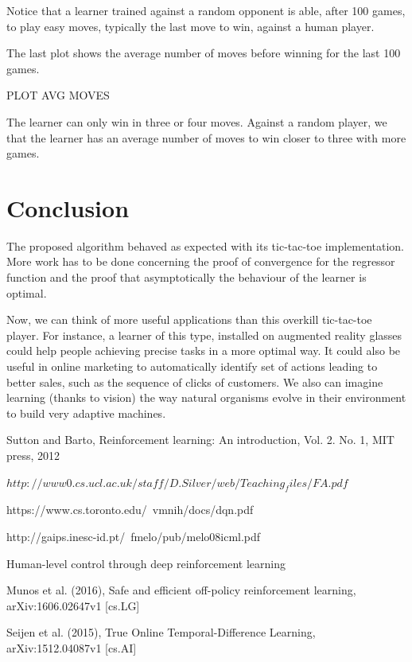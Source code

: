 \documentclass[letterpaper, 10.5 pt, conference]{ieeeconf}
\begin{document}
Notice that a learner trained against a random opponent is able, after 100 games, to play easy moves, typically the last move to win, against a human player.

The last plot shows the average number of moves before winning for the last 100 games. 

PLOT AVG MOVES

The learner can only win in three or four moves. Against a random player, we that the learner has an average number of moves to win closer to three with more games.

\section{Conclusion}

The proposed algorithm behaved as expected with its tic-tac-toe implementation. More work has to be done concerning the proof of convergence for the regressor function and the proof that asymptotically the behaviour of the learner is optimal.

Now, we can think of more useful applications than this overkill tic-tac-toe player. For instance, a learner of this type, installed on augmented reality glasses could help people achieving precise tasks in a more optimal way. It could also be useful in online marketing to automatically identify set of actions leading to better sales, such as the sequence of clicks of customers. We also can imagine learning (thanks to vision) the way natural organisms evolve in their environment to build very adaptive machines.

\addtolength{\textheight}{-12cm}   %

\begin{thebibliography}{99}

 Sutton and Barto, Reinforcement learning: An introduction, Vol. 2. No. 1, MIT press, 2012

 $http://www0.cs.ucl.ac.uk/staff/D.Silver/web/Teaching_files/FA.pdf$

 https://www.cs.toronto.edu/~vmnih/docs/dqn.pdf

 http://gaips.inesc-id.pt/~fmelo/pub/melo08icml.pdf

 Human-level control through deep reinforcement learning

 Munos et al. (2016), Safe and efficient off-policy reinforcement learning, arXiv:1606.02647v1 [cs.LG]

 Seijen et al. (2015), True Online Temporal-Difference Learning, arXiv:1512.04087v1 [cs.AI]

\end{thebibliography}
\end{document}
